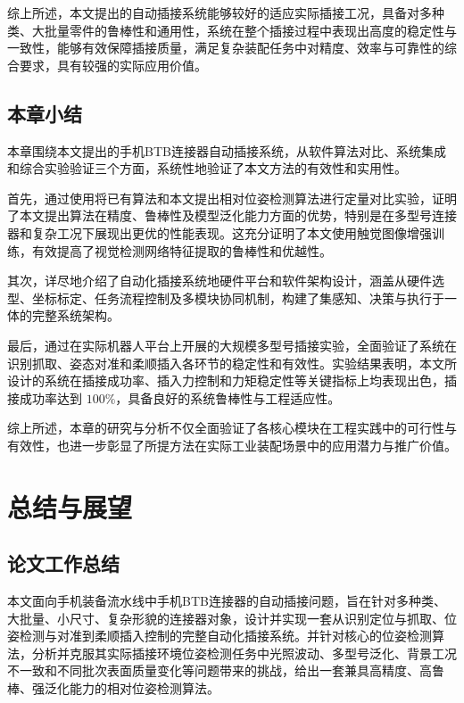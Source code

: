 \documentclass{Diploma}
\begin{document}
综上所述，本文提出的自动插接系统能够较好的适应实际插接工况，具备对多种类、大批量零件的鲁棒性和通用性，系统在整个插接过程中表现出高度的稳定性与一致性，能够有效保障插接质量，满足复杂装配任务中对精度、效率与可靠性的综合要求，具有较强的实际应用价值。
\section{本章小结}
本章围绕本文提出的手机BTB连接器自动插接系统，从软件算法对比、系统集成和综合实验验证三个方面，系统性地验证了本文方法的有效性和实用性。

首先，通过使用将已有算法和本文提出相对位姿检测算法进行定量对比实验，证明了本文提出算法在精度、鲁棒性及模型泛化能力方面的优势，特别是在多型号连接器和复杂工况下展现出更优的性能表现。这充分证明了本文使用触觉图像增强训练，有效提高了视觉检测网络特征提取的鲁棒性和优越性。

其次，详尽地介绍了自动化插接系统地硬件平台和软件架构设计，涵盖从硬件选型、坐标标定、任务流程控制及多模块协同机制，构建了集感知、决策与执行于一体的完整系统架构。

最后，通过在实际机器人平台上开展的大规模多型号插接实验，全面验证了系统在识别抓取、姿态对准和柔顺插入各环节的稳定性和有效性。实验结果表明，本文所设计的系统在插接成功率、插入力控制和力矩稳定性等关键指标上均表现出色，插接成功率达到 $100\%$，具备良好的系统鲁棒性与工程适应性。

综上所述，本章的研究与分析不仅全面验证了各核心模块在工程实践中的可行性与有效性，也进一步彰显了所提方法在实际工业装配场景中的应用潜力与推广价值。
\chapter{总结与展望}
\section{论文工作总结}
本文面向手机装备流水线中手机BTB连接器的自动插接问题，旨在针对多种类、大批量、小尺寸、复杂形貌的连接器对象，设计并实现一套从识别定位与抓取、位姿检测与对准到柔顺插入控制的完整自动化插接系统。并针对核心的位姿检测算法，分析并克服其实际插接环境位姿检测任务中光照波动、多型号泛化、背景工况不一致和不同批次表面质量变化等问题带来的挑战，给出一套兼具高精度、高鲁棒、强泛化能力的相对位姿检测算法。
\end{document}
